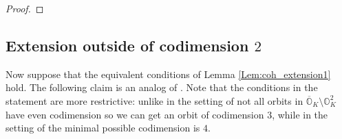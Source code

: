 \documentclass[12pt]{amsart}
\newcommand{\C}{\mathbb{C}}
\newcommand{\A}{\mathcal{A}}
\newcommand{\Orb}{\mathbb{O}}
\theoremstyle{definition}
\numberwithin{equation}{section}
\begin{document}
\begin{proof}
\end{proof}





\subsection{Extension outside of codimension $2$}
Now suppose that the equivalent conditions of Lemma
\ref{Lem:coh_extension1} hold. The following claim
is an analog of \cite[Lemma 3.5]{HC_symp}. Note that the conditions
in the statement are more restrictive: unlike in the setting of
\cite{HC_symp} not all orbits in $\overline{\Orb}_K\setminus \Orb_K^2$ have even
codimension so we can get an orbit of codimension $3$, while in the setting
of \cite{HC_symp} the minimal possible codimension is $4$.
\end{document}
